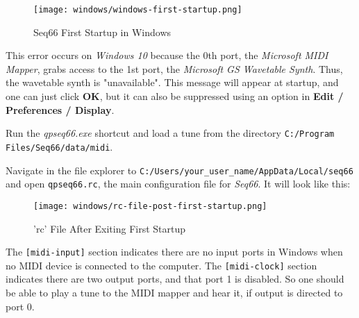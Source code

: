 \begin{figure}[H]
   \centering 
   \texttt{[image: windows/windows-first-startup.png]}
   \caption{Seq66 First Startup in Windows}
   \label{fig:windows_first_startup}
\end{figure}

   This error occurs on \textsl{Windows 10} because the 0th port, the
   \textsl{Microsoft MIDI Mapper}, grabs access to the 1st port, the
   \textsl{Microsoft GS Wavetable Synth}.
   Thus, the wavetable synth is "unavailable".
   This message will appear at startup, and one can just click
   \textbf{OK}, but it can also be suppressed using an option in
   \textbf{Edit / Preferences / Display}.


   Run the \textsl{qpseq66.exe} shortcut and load a tune from the
   directory \texttt{C:/Program Files/Seq66/data/midi}.


   Navigate in the file explorer to
   \texttt{C:/Users/your\_user\_name/AppData/Local/seq66} and open
   \texttt{qpseq66.rc}, the main configuration file for \textsl{Seq66}.
   It will look like this:

\begin{figure}[H]
   \centering 
   \texttt{[image: windows/rc-file-post-first-startup.png]}
   \caption{'rc' File After Exiting First Startup}
   \label{fig:windows_rc_file_post_first_startup}
\end{figure}

   The \texttt{[midi-input]} section indicates there are no input ports
   in Windows when no MIDI device is connected to the computer.
   The \texttt{[midi-clock]} section indicates there are two output
   ports, and that port 1 is disabled.   So one should be able to
   play a tune to the MIDI mapper and hear it, if output is directed
   to port 0.


